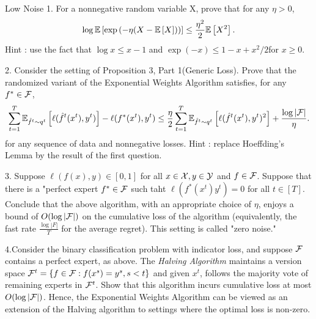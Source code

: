 \begin{exercise}[]{Low Noise}
1. For a nonnegative random variable X, prove that for any $ \eta >0 $,
\begin{equation*}
	\log \EE{\exp{(- \eta (X - \EE{X}))}} \leq  \frac{\eta^2}{2}\EE{X^2}.
\end{equation*}
Hint : use the fact that $ \log x \leq x-1 $ and $ \exp(-x) \leq 1 - x + x^2/2 $for $ x\geq 0 $.

2. Consider the setting of Proposition 3, Part 1(Generic Loss). Prove that the randomized variant of the Exponential
Weights Algorithm satisfies, for any $ f^{*} \in \F $,
\begin{equation*}
	\sum_{t=1}^{T}\EEs{\ell(\hat{f}^{t}(x^t),y^t)}{\hat{f}^{t}\sim q^{t}} - \ell(f^{*}(x^t),y^t) \leq
	\frac{\eta}{2}\sum_{t=1}^{T}\EEs{\ell(\hat{f}^{t}(x^t),y^t)^2}{\hat{f}^{t}\sim q^{t}} + \frac{\log |\F|}{\eta}.
\end{equation*}
for any sequence of data and nonnegative losses. Hint : replace Hoeffding's Lemma by the result of the first question.

3. Suppose $ \ell(f(x),y) \in [0,1] $ for all $ x \in \X, y \in \Y $ and $ f\in \F $. Suppose that there is a "perfect
expert $ f^{*}\in \F $ such taht $ \ell(f^{*}(x^t)y^t) = 0 $ for all $ t\in [T] $. Conclude that the above algorithm,
with an appropriate choice of $ \eta $, enjoys a bound of $ O(\log |\F|) $ on the cumulative loss of the algorithm
(equivalently, the fast rate $ \frac{\log |F|}{T} $ for the average regret). This setting is called "zero noise."

4.Consider the binary classification problem with indicator loss, and suppose $ \F $ contains a perfect expert, as
above. The \textit{Halving Algorithm} maintains a version space $ \F^{t} = \{ f \in \F : f(x^s)=y^s, s<t \} $ and given
$ x^{t} $, follows the majority vote of remaining experts in $ \F^{t} $. Show that this algorithm incurs cumulative loss
at most $ O(\log |\F|) $. Hence, the Exponential Weights Algorithm can be viewed as an extension of the Halving
algorithm to settings where the optimal loss is non-zero.

\end{exercise}

